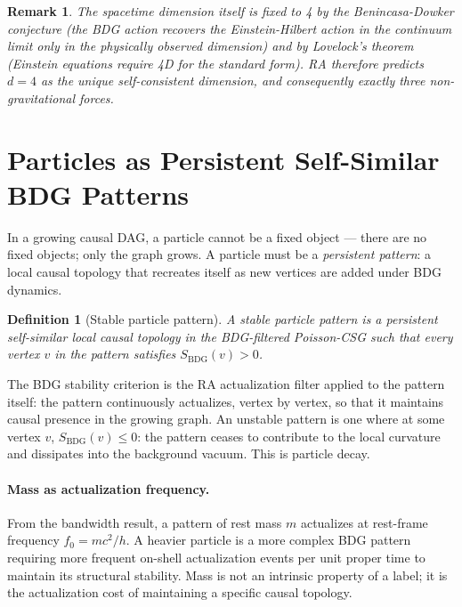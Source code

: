 \documentclass[11pt,a4paper]{article}
\newtheorem{definition}[theorem]{Definition}
\newtheorem{remark}[theorem]{Remark}
\newcommand{\SBDG}{S_{\mathrm{BDG}}}
\begin{document}
\begin{remark}
The spacetime dimension itself is fixed to 4 by the Benincasa-Dowker conjecture
(the BDG action recovers the Einstein-Hilbert action in the continuum limit
only in the physically observed dimension) and by Lovelock's theorem (Einstein
equations require 4D for the standard form). RA therefore predicts $d = 4$ as
the unique self-consistent dimension, and consequently exactly three
non-gravitational forces.
\end{remark}

\section{Particles as Persistent Self-Similar BDG Patterns}
\label{sec:particles}

In a growing causal DAG, a particle cannot be a fixed object --- there are no
fixed objects; only the graph grows. A particle must be a \emph{persistent
pattern}: a local causal topology that recreates itself as new vertices are
added under BDG dynamics.

\begin{definition}[Stable particle pattern]
A stable particle pattern is a persistent self-similar local causal topology
in the BDG-filtered Poisson-CSG such that every vertex $v$ in the pattern
satisfies $\SBDG(v) > 0$.
\end{definition}

The BDG stability criterion is the RA actualization filter applied to the
pattern itself: the pattern continuously actualizes, vertex by vertex, so that
it maintains causal presence in the growing graph. An unstable pattern is one
where at some vertex $v$, $\SBDG(v) \leq 0$: the pattern ceases to contribute
to the local curvature and dissipates into the background vacuum. This is
particle decay.

\paragraph{Mass as actualization frequency.}
From the bandwidth result, a pattern of rest mass $m$ actualizes at rest-frame
frequency $f_0 = mc^2/h$. A heavier particle is a more complex BDG pattern
requiring more frequent on-shell actualization events per unit proper time to
maintain its structural stability. Mass is not an intrinsic property of a
label; it is the actualization cost of maintaining a specific causal topology.
\end{document}
